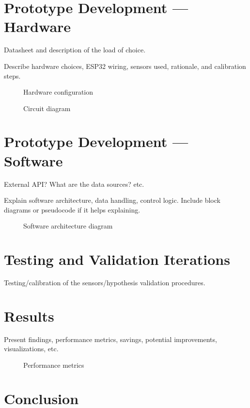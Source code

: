 \documentclass[12pt]{article}
\begin{document}
\section{Prototype Development --- Hardware}

Datasheet and description of the load of choice.

Describe hardware choices, ESP32 wiring, sensors used, rationale, and calibration steps.

\begin{figure}[H]
\centering
\caption{Hardware configuration}
\end{figure}

\begin{figure}[H]
\centering
\caption{Circuit diagram}
\end{figure}

\section{Prototype Development --- Software}

External API? What are the data sources? etc.

Explain software architecture, data handling, control logic. Include block diagrams or pseudocode if it helps explaining.

\begin{figure}[H]
\centering
\caption{Software architecture diagram}
\end{figure}

\section{Testing and Validation Iterations}

Testing/calibration of the sensors/hypothesis validation procedures.

\section{Results}

Present findings, performance metrics, savings, potential improvements, visualizations, etc.

\begin{figure}[H]
\centering
\caption{Performance metrics}
\end{figure}

\section{Conclusion}
\end{document}
